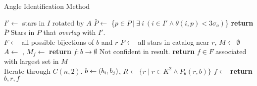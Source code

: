 
\newcommand{\invalidBijection}{\If{$\forall \ \vv{b^\star}, \ \vv{b^\star} \in b \land f\left(\vv{b^\star}\right)
\neq \emptyset$}}
\begin{algorithm}[ht]
    \caption{Angle Identification Method} \label{algorithm:angleIdentification}
    \begin{algorithmic}[1]
        \State $I' \gets$ stars in $I$ rotated by $A$
        \State $\bar{P} \gets $ \{$p \in P \ | \ \exists \ i \ (i \in I' \land \theta (i, p) < 3\sigma_o)$\}
        \State \textbf{return} $\bar{P}$ \Comment Stars in $P$ that \textit{overlay} with $I'$.
        \EndFunction
        \\
        \State $F \gets $ all possible bijections of $b$ and $r$
        \State $P \gets $ all stars in catalog near $r$, $M \gets \emptyset$
        \State $A \gets $ , $M_f \gets $ 
        \EndFor
        \State \textbf{return} $f : b \rightarrow \emptyset $ \Comment Not confident in result.
        \Else
        \State \textbf{return} $f \in F$ associated with largest set in $M$
        \EndIf
        \EndFunction
        \\
         \Comment Iterate through $C(n, 2)$.
        \State $b \gets \left(b_i, b_j\right)$, $R \gets \{ r \mid r \in K^2 \land P_\theta(r, b) \}$
        \State $f \gets $  %
        \invalidBijection
        \State \textbf{return} $b, r, f$
        \EndIf
        \EndIf
        \EndFor
        \EndFor
        \EndFunction
    \end{algorithmic}
\end{algorithm}

